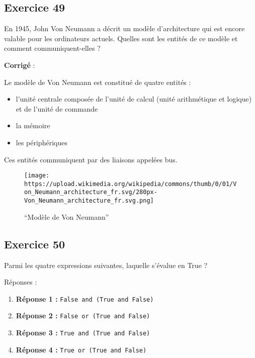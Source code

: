 \documentclass[11pt]{article}
\makeatletter
\def\maxwidth{\ifdim\Gin@nat@width>\linewidth\linewidth
    \else\Gin@nat@width\fi}
\let\Oldincludegraphics\includegraphics
\renewcommand{\includegraphics}[1]{\Oldincludegraphics[width=.8\maxwidth]{#1}}
\providecommand{\tightlist}{%
      \setlength{\itemsep}{0pt}\setlength{\parskip}{0pt}}
\makeatother
\begin{document}
    \hypertarget{exercice-49}{%
\subsection{Exercice 49}\label{exercice-49}}

En 1945, John Von Neumann a décrit un modèle d'architecture qui est
encore valable pour les ordinateurs actuels. Quelles sont les entités de
ce modèle et comment communiquent-elles ?

    \textbf{Corrigé} :

Le modèle de Von Neumann est constitué de quatre entités :

\begin{itemize}
\tightlist
\item
  l'unité centrale composée de l'unité de calcul (unité arithmétique et
  logique) et de l'unité de commande
\item
  la mémoire
\item
  les périphériques
\end{itemize}

Ces entités communiquent par des liaisons appelées bus.

\begin{figure}
\centering
\texttt{[image: https://upload.wikimedia.org/wikipedia/commons/thumb/0/01/Von\_Neumann\_architecture\_fr.svg/280px-Von\_Neumann\_architecture\_fr.svg.png]}
\caption{``Modèle de Von Neumann''}
\end{figure}

    \hypertarget{exercice-50}{%
\subsection{Exercice 50}\label{exercice-50}}

Parmi les quatre expressions suivantes, laquelle s'évalue en True ?

Réponses :

\begin{enumerate}
\def\labelenumi{\arabic{enumi}.}
\item
  \textbf{Réponse 1 :} \texttt{False\ and\ (True\ and\ False)}
\item
  \textbf{Réponse 2 :} \texttt{False\ or\ (True\ and\ False)}
\item
  \textbf{Réponse 3 :} \texttt{True\ and\ (True\ and\ False)}
\item
  \textbf{Réponse 4 :} \texttt{True\ or\ (True\ and\ False)}
\end{enumerate}
\end{document}

